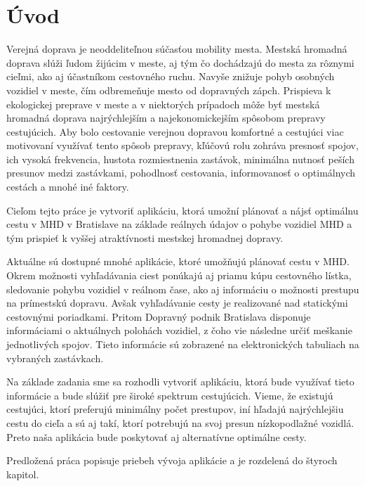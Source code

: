 \chapter*{Úvod} %

Verejná doprava je neoddeliteľnou súčasťou mobility mesta. Mestská hromadná doprava slúži ľudom žijúcim v meste, aj tým čo dochádzajú do mesta za rôznymi cieľmi, ako aj účastníkom cestovného ruchu. Navyše znižuje pohyb osobných vozidiel v meste, čím odbremeňuje mesto od dopravných zápch. Prispieva k ekologickej preprave v meste a v niektorých prípadoch môže byť mestská hromadná doprava najrýchlejším a najekonomickejším spôsobom prepravy cestujúcich. Aby bolo cestovanie verejnou dopravou komfortné a cestujúci viac motivovaní využívať tento spôsob prepravy, kľúčovú rolu zohráva presnosť spojov, ich vysoká frekvencia, hustota rozmiestnenia zastávok, minimálna nutnosť peších presunov medzi zastávkami, pohodlnosť cestovania, informovanosť o optimálnych cestách a mnohé iné faktory.

Cieľom tejto práce je vytvoriť aplikáciu, ktorá umožní plánovať a nájsť optimálnu cestu v MHD v Bratislave na základe reálnych údajov o pohybe vozidiel MHD a tým prispieť k vyššej atraktívnosti mestskej hromadnej dopravy. 

Aktuálne sú dostupné mnohé aplikácie, ktoré umožňujú plánovať cestu v MHD. Okrem možnosti vyhľadávania ciest ponúkajú aj priamu kúpu cestovného lístka, sledovanie pohybu vozidiel v reálnom čase, ako aj informáciu o možnosti prestupu na prímestskú dopravu. Avšak vyhľadávanie cesty je realizované nad statickými cestovnými poriadkami. Pritom Dopravný podnik Bratislava disponuje informáciami o aktuálnych polohách vozidiel, z čoho vie následne určiť meškanie jednotlivých spojov. Tieto informácie sú zobrazené na elektronických tabuliach na vybraných zastávkach.

Na základe zadania sme sa rozhodli vytvoriť aplikáciu, ktorá bude využívať tieto informácie a bude slúžiť pre široké spektrum cestujúcich. Vieme, že existujú cestujúci, ktorí preferujú minimálny počet prestupov, iní hľadajú najrýchlejšiu cestu do cieľa a sú aj takí, ktorí potrebujú na svoj presun nízkopodlažné vozidlá. Preto naša aplikácia bude poskytovať aj alternatívne optimálne cesty.

Predložená práca popisuje priebeh vývoja aplikácie a je rozdelená do štyroch kapitol. 

